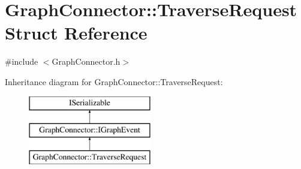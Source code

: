\hypertarget{struct_graph_connector_1_1_traverse_request}{}\section{Graph\+Connector\+:\+:Traverse\+Request Struct Reference}
\label{struct_graph_connector_1_1_traverse_request}


{\ttfamily \#include $<$Graph\+Connector.\+h$>$}

Inheritance diagram for Graph\+Connector\+:\+:Traverse\+Request\+:\begin{figure}[H]
\begin{center}
\leavevmode
\includegraphics[height=3.000000cm]{struct_graph_connector_1_1_traverse_request}
\end{center}
\end{figure}
